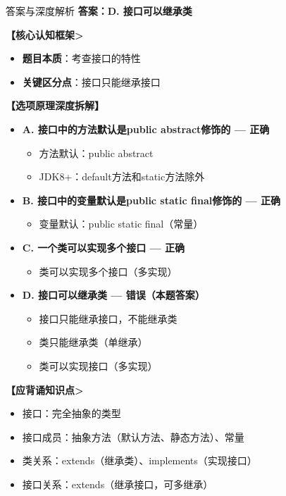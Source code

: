 \documentclass[12pt, a4paper]{ctexart}
\begin{document}
\begin{enumerate}[label=\textbf{\arabic*.}]
	      \begin{bluebox}{答案与深度解析}
		      \textbf{答案：D. 接口可以继承类}

		      \textbf{【核心认知框架>}
		      \begin{itemize}[leftmargin=*, nosep, label={}]
			      \item \textbf{题目本质}：考查接口的特性
			      \item \textbf{关键区分点}：接口只能继承接口
		      \end{itemize}

		      \textbf{【选项原理深度拆解】}
		      \begin{itemize}[label={}, nosep]
			      \item \textbf{A. 接口中的方法默认是public abstract修饰的 — 正确}
			      \begin{itemize}[label={}, nosep]
				      \item 方法默认：public abstract
				      \item JDK8+：default方法和static方法除外
			      \end{itemize}
			      \item \textbf{B. 接口中的变量默认是public static final修饰的 — 正确}
			      \begin{itemize}[label={}, nosep]
				      \item 变量默认：public static final（常量）
			      \end{itemize}
			      \item \textbf{C. 一个类可以实现多个接口 — 正确}
			      \begin{itemize}[label={}, nosep]
				      \item 类可以实现多个接口（多实现）
			      \end{itemize}
			      \item \textbf{D. 接口可以继承类 — 错误（本题答案）}
			      \begin{itemize}[label={}, nosep]
				      \item 接口只能继承接口，不能继承类
				      \item 类只能继承类（单继承）
				      \item 类可以实现接口（多实现）
			      \end{itemize}
		      \end{itemize}

		      \textbf{【应背诵知识点>}
		      \begin{itemize}[label={}, nosep]
			      \item 接口：完全抽象的类型
			      \item 接口成员：抽象方法（默认方法、静态方法）、常量
			      \item 类关系：extends（继承类）、implements（实现接口）
			      \item 接口关系：extends（继承接口，可多继承）
		      \end{itemize}
	      \end{bluebox}


\end{enumerate}
\end{document}
